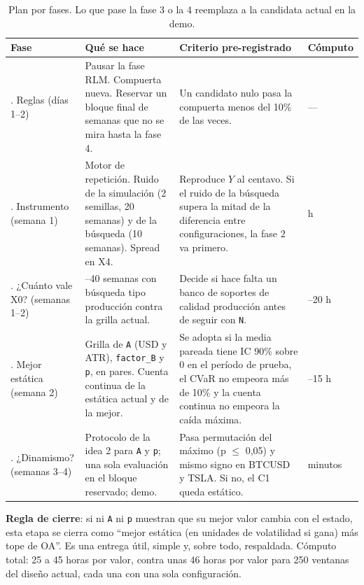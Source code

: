 \documentclass[11pt,a4paper]{article}
\newcommand{\code}[1]{\texttt{\small #1}}
\begin{document}
\begin{table}[h]
\centering\small
\begin{tabularx}{\linewidth}{@{}>{\raggedright\arraybackslash}p{2.1cm}>{\raggedright\arraybackslash}X>{\raggedright\arraybackslash}X>{\raggedright\arraybackslash}p{1.4cm}@{}}
\toprule
Fase & Qué se hace & Criterio pre-registrado & Cómputo \\
\midrule
0. Reglas (días 1--2) & Pausar la fase RLM. Compuerta nueva. Reservar un bloque final de semanas que no se
mira hasta la fase 4. & Un candidato nulo pasa la compuerta menos del 10\% de las veces. & — \\
1. Instrumento (semana 1) & Motor de repetición. Ruido de la simulación (2 semillas, 20 semanas) y de la
búsqueda (10 semanas). Spread en X4. & Reproduce $Y$ al centavo. Si el ruido de la búsqueda supera la mitad
de la diferencia entre configuraciones, la fase 2 va primero. & 2 h \\
2. ¿Cuánto vale X0? (semanas 1--2) & 20--40 semanas con búsqueda tipo producción contra la grilla actual.
& Decide si hace falta un banco de soportes de calidad producción antes de seguir con \code{N}. & 10--20 h \\
3. Mejor estática (semana 2) & Grilla de \code{A} (USD y ATR), \code{factor\_B} y \code{p}, en pares.
Cuenta continua de la estática actual y de la mejor. & Se adopta si la media pareada tiene IC 90\% sobre 0
en el período de prueba, el CVaR no empeora más de 10\% y la cuenta continua no empeora la caída máxima. &
6--15 h \\
4. ¿Dinamismo? (semanas 3--4) & Protocolo de la idea 2 para \code{A} y \code{p}; una sola evaluación en el
bloque reservado; demo. & Pasa permutación del máximo (p $\leq$ 0,05) y mismo signo en BTCUSD y TSLA. Si
no, el C1 queda estático. & minutos \\
\bottomrule
\end{tabularx}
\caption{Plan por fases. Lo que pase la fase 3 o la 4 reemplaza a la candidata actual en la demo.}
\label{tab:plan}
\end{table}

\textbf{Regla de cierre}: si ni \code{A} ni \code{p} muestran que su mejor valor cambia con el estado, esta
etapa se cierra como ``mejor estática (en unidades de volatilidad si gana) más tope de OA''. Es una
entrega útil, simple y, sobre todo, respaldada. Cómputo total: 25 a 45 horas por valor, contra unas 46
horas por valor para 250 ventanas del diseño actual, cada una con una sola configuración.
\end{document}
